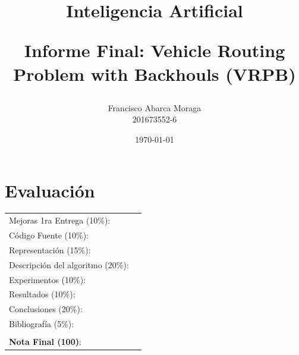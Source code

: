 \documentclass[letter, 10pt]{article}
\begin{document}
\title{Inteligencia Artificial \\ \begin{Large}Informe Final: Vehicle Routing Problem with Backhouls (VRPB)\end{Large}}
\author{Francisco Abarca Moraga\\201673552-6}
\date{\today}
\maketitle


\section*{Evaluaci\'on}

\begin{tabular}{ll}
Mejoras 1ra Entrega (10\%): &  \underline{\hspace{2cm}}\\
C\'odigo Fuente (10\%): &  \underline{\hspace{2cm}}\\
Representaci\'on (15\%):  & \underline{\hspace{2cm}} \\
Descripci\'on del algoritmo (20\%):  & \underline{\hspace{2cm}} \\
Experimentos (10\%):  & \underline{\hspace{2cm}} \\
Resultados (10\%):  & \underline{\hspace{2cm}} \\
Conclusiones (20\%): &  \underline{\hspace{2cm}}\\
Bibliograf\'ia (5\%): & \underline{\hspace{2cm}}\\
 &  \\
\textbf{Nota Final (100)}:   & \underline{\hspace{2cm}}
\end{tabular}
\vspace{2cm}
\end{document}
